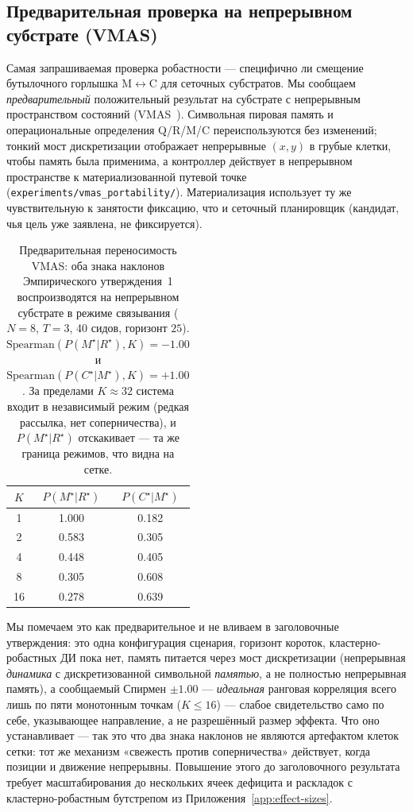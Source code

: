 \documentclass{article}
\newcommand{\method}[1]{\texttt{#1}}
\begin{document}
\subsection{Предварительная проверка на непрерывном субстрате (VMAS)}
\label{app:vmas}

Самая запрашиваемая проверка робастности --- специфично ли смещение бутылочного горлышка
M$\leftrightarrow$C для сеточных субстратов. Мы сообщаем \emph{предварительный}
положительный результат на субстрате с непрерывным пространством состояний (VMAS~\citep{bettini2022vmas}).
Символьная пировая память и операциональные определения Q/R/M/C переиспользуются
без изменений; тонкий мост дискретизации отображает непрерывные $(x,y)$ в грубые клетки,
чтобы память была применима, а контроллер действует в непрерывном пространстве к
материализованной путевой точке (\method{experiments/vmas\_portability/}). Материализация
использует ту же чувствительную к занятости фиксацию, что и сеточный планировщик (кандидат, чья
цель уже заявлена, не фиксируется).

\begin{table}[h]
\caption{Предварительная переносимость VMAS: оба знака наклонов Эмпирического утверждения~1 воспроизводятся на непрерывном субстрате в режиме связывания ($N{=}8$, $T{=}3$, 40 сидов, горизонт $25$). $\mathrm{Spearman}(P(M^\star|R^\star),K){=}-1.00$ и $\mathrm{Spearman}(P(C^\star|M^\star),K){=}+1.00$. За пределами $K\!\approx\!32$ система входит в независимый режим (редкая рассылка, нет соперничества), и $P(M^\star|R^\star)$ отскакивает --- та же граница режимов, что видна на сетке.}
\label{tab:vmas}
\centering
\small
\begin{tabular}{c c c}
\toprule
$K$ & $P(M^\star|R^\star)$ & $P(C^\star|M^\star)$ \\
\midrule
1  & 1.000 & 0.182 \\
2  & 0.583 & 0.305 \\
4  & 0.448 & 0.405 \\
8  & 0.305 & 0.608 \\
16 & 0.278 & 0.639 \\
\bottomrule
\end{tabular}
\end{table}

Мы помечаем это как предварительное и не вливаем в заголовочные утверждения: это
одна конфигурация сценария, горизонт короток, кластерно-робастных ДИ пока нет,
память питается через мост дискретизации (непрерывная
\emph{динамика} с дискретизованной символьной \emph{памятью}, а не полностью непрерывная
память), а сообщаемый Спирмен $\pm1.00$ --- \emph{идеальная} ранговая
корреляция всего лишь по пяти монотонным точкам ($K\le16$) --- слабое свидетельство само по
себе, указывающее направление, а не разрешённый размер эффекта. Что оно устанавливает --- так это что два знака наклонов не являются артефактом
клеток сетки: тот же механизм «свежесть против соперничества» действует, когда позиции
и движение непрерывны. Повышение этого до заголовочного результата требует масштабирования
до нескольких ячеек дефицита и раскладок с кластерно-робастным бутстрепом из
Приложения~\ref{app:effect-sizes}.
\end{document}
